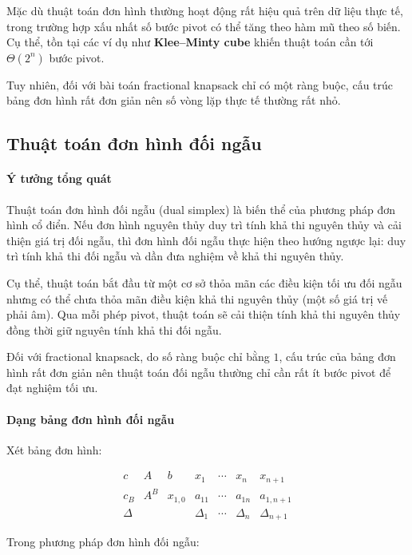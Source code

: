 \documentclass[fontsize=13pt,a4paper]{report}
\begin{document}
Mặc dù thuật toán đơn hình thường hoạt động rất hiệu quả trên dữ liệu thực tế, trong trường hợp xấu nhất số bước pivot có thể tăng theo hàm mũ theo số biến. Cụ thể, tồn tại các ví dụ như \textbf{Klee--Minty cube} khiến thuật toán cần tới \(\Theta(2^n)\) bước pivot.

Tuy nhiên, đối với bài toán fractional knapsack chỉ có một ràng buộc, cấu trúc bảng đơn hình rất đơn giản nên số vòng lặp thực tế thường rất nhỏ.

\subsection{Thuật toán đơn hình đối ngẫu}

\paragraph{Ý tưởng tổng quát}

Thuật toán đơn hình đối ngẫu (dual simplex) là biến thể của phương pháp đơn hình cổ điển. Nếu đơn hình nguyên thủy duy trì tính khả thi nguyên thủy và cải thiện giá trị đối ngẫu, thì đơn hình đối ngẫu thực hiện theo hướng ngược lại: duy trì tính khả thi đối ngẫu và dần đưa nghiệm về khả thi nguyên thủy.

Cụ thể, thuật toán bắt đầu từ một cơ sở thỏa mãn các điều kiện tối ưu đối ngẫu nhưng có thể chưa thỏa mãn điều kiện khả thi nguyên thủy (một số giá trị vế phải âm). Qua mỗi phép pivot, thuật toán sẽ cải thiện tính khả thi nguyên thủy đồng thời giữ nguyên tính khả thi đối ngẫu.

Đối với fractional knapsack, do số ràng buộc chỉ bằng \(1\), cấu trúc của bảng đơn hình rất đơn giản nên thuật toán đối ngẫu thường chỉ cần rất ít bước pivot để đạt nghiệm tối ưu.

\paragraph{Dạng bảng đơn hình đối ngẫu}

Xét bảng đơn hình:

\[
\begin{array}{ccc|cccc}
c & A & b & x_1 & \cdots & x_n & x_{n+1} \\
\hline
c_B & A^B & x_{1,0} & a_{11} & \cdots & a_{1n} & a_{1,n+1} \\
\hline
\Delta & & & \Delta_1 & \cdots & \Delta_n & \Delta_{n+1}
\end{array}
\]

Trong phương pháp đơn hình đối ngẫu:
\end{document}
